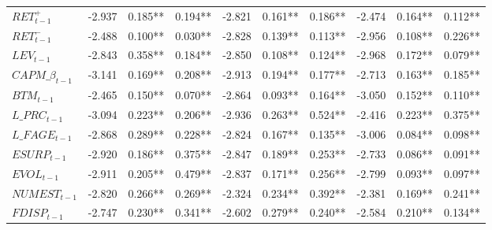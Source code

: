 \begin{landscape}
\begin{xltabular}{\linewidth}{X * {9}{S[table-format=5.3]}}
\endfoot
\bottomrule
\endlastfoot
$RET^+_{t-1}$ & -2.937 & 0.185** & 0.194** & -2.821 & 0.161** & 0.186** & -2.474 & 0.164** & 0.112**\\
\addlinespace
$RET^-_{t-1}$ & -2.488 & 0.100** & 0.030** & -2.828 & 0.139** & 0.113** & -2.956 & 0.108** & 0.226**\\
\addlinespace
$LEV_{t-1}$ & -2.843 & 0.358** & 0.184** & -2.850 & 0.108** & 0.124** & -2.968 & 0.172** & 0.079**\\
\addlinespace
$CAPM\_\beta_{t-1}$ & -3.141 & 0.169** & 0.208** & -2.913 & 0.194** & 0.177** & -2.713 & 0.163** & 0.185**\\
\addlinespace
$BTM_{t-1}$ & -2.465 & 0.150** & 0.070** & -2.864 & 0.093** & 0.164** & -3.050 & 0.152** & 0.110**\\
\addlinespace
$L\_PRC_{t-1}$ & -3.094 & 0.223** & 0.206** & -2.936 & 0.263** & 0.524** & -2.416 & 0.223** & 0.375**\\
\addlinespace
$L\_FAGE_{t-1}$ & -2.868 & 0.289** & 0.228** & -2.824 & 0.167** & 0.135** & -3.006 & 0.084** & 0.098**\\
\addlinespace
$ESURP_{t-1}$ & -2.920 & 0.186** & 0.375** & -2.847 & 0.189** & 0.253** & -2.733 & 0.086** & 0.091**\\
\addlinespace
$EVOL_{t-1}$ & -2.911 & 0.205** & 0.479** & -2.837 & 0.171** & 0.256** & -2.799 & 0.093** & 0.097**\\
\addlinespace
$NUMEST_{t-1}$ & -2.820 & 0.266** & 0.269** & -2.324 & 0.234** & 0.392** & -2.381 & 0.169** & 0.241**\\
\addlinespace
$FDISP_{t-1}$ & -2.747 & 0.230** & 0.341** & -2.602 & 0.279** & 0.240** & -2.584 & 0.210** & 0.134**\\*
\end{xltabular}
\endgroup{}
\end{landscape}
